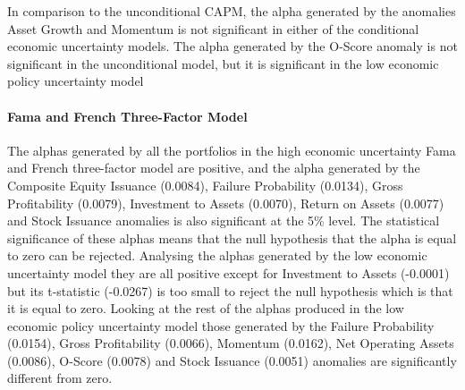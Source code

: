 \documentclass[12pt, a4paper, oneside]{article}
\begin{document}
In comparison to the unconditional CAPM, the alpha generated by the anomalies Asset Growth and Momentum is not significant in either of the conditional economic uncertainty models. The alpha generated by the O-Score anomaly is not significant in the unconditional model, but it is significant in the low economic policy uncertainty model

\paragraph{Fama and French Three-Factor Model}
The alphas generated by all the portfolios in the high economic uncertainty Fama and French three-factor model are positive, and the alpha generated by the Composite Equity Issuance (0.0084), Failure Probability (0.0134), Gross Profitability (0.0079), Investment to Assets (0.0070), Return on Assets (0.0077) and Stock Issuance anomalies is also significant at the 5\% level. The statistical significance of these alphas means that the null hypothesis that the alpha is equal to zero can be rejected. Analysing the alphas generated by the low economic uncertainty model they are all positive except for Investment to Assets (-0.0001) but its t-statistic (-0.0267) is too small to reject the null hypothesis which is that it is equal to zero. Looking at the rest of the alphas produced in the low economic policy uncertainty model those generated by the Failure Probability (0.0154), Gross Profitability (0.0066), Momentum (0.0162), Net Operating Assets (0.0086), O-Score (0.0078) and Stock Issuance (0.0051) anomalies are significantly different from zero. 
\end{document}
